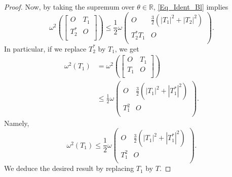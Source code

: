 \documentclass[12pt,twoside,reqno]{amsart}
\numberwithin{equation}{section}
\begin{document}
\begin{proof}
Now, by taking the supremum over $\theta \in \mathbb{R}$, \eqref{Eq_Ident_Bl} implies
	\[{{\omega }^{2}}\left( \left[ \begin{matrix}
   O & {{T}_{1}}  \\
   T_{2}^{*} & O  \\
\end{matrix} \right] \right)\le \frac{1}{2}\omega \left( \begin{matrix}
   O & \frac{3}{2}\left( {{\left| {{T}_{1}} \right|}^{2}}+{{\left| {{T}_{2}} \right|}^{2}} \right)  \\
   T_{2}^{*}{{T}_{1}} & O  \\
\end{matrix} \right).\]
In particular, if we replace $T_{2}^{*}$ by ${{T}_{1}}$, we get
	\[\begin{aligned}
   {{\omega }^{2}}\left( {{T}_{1}} \right)&={{\omega }^{2}}\left( \left[ \begin{matrix}
   O & {{T}_{1}}  \\
   {{T}_{1}} & O  \\
\end{matrix} \right] \right) \\ 
 & \le \frac{1}{2}\omega \left( \begin{matrix}
   O & \frac{3}{2}\left( {{\left| {{T}_{1}} \right|}^{2}}+{{\left| T_{1}^{*} \right|}^{2}} \right)  \\
   T_{1}^{2} & O  \\
\end{matrix} \right).  
\end{aligned}\]
Namely,
	\[{{\omega }^{2}}\left( {{T}_{1}} \right)\le \frac{1}{2}\omega \left( \begin{matrix}
   O & \frac{3}{2}\left( {{\left| {{T}_{1}} \right|}^{2}}+{{\left| T_{1}^{*} \right|}^{2}} \right)  \\
   T_{1}^{2} & O  \\
\end{matrix} \right).\]
We deduce the desired result by replacing $T_1$ by $T$.
\end{proof}	
\end{document}
